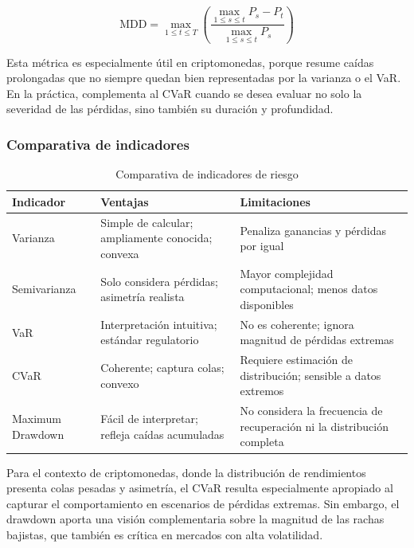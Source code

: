 \begin{equation}
  \mathrm{MDD} = \max_{1 \leq t \leq T}
  \left(
  \frac{\max_{1 \leq s \leq t} P_s - P_t}{\max_{1 \leq s \leq t} P_s}
  \right)
\end{equation}

Esta métrica es especialmente útil en criptomonedas, porque resume
caídas prolongadas que no siempre quedan bien representadas por la
varianza o el VaR. En la práctica, complementa al CVaR cuando se desea
evaluar no solo la severidad de las pérdidas, sino también su duración
y profundidad.

\subsubsection{Comparativa de indicadores}

\begin{table}[ht]
  \centering
  \caption{Comparativa de indicadores de riesgo}
  \label{tab:indicadores-riesgo}
  \begin{tabularx}{\textwidth}{lXX}
    \toprule
    \textbf{Indicador} & \textbf{Ventajas} & \textbf{Limitaciones} \\
    \midrule
    Varianza &
    Simple de calcular; ampliamente conocida; convexa &
    Penaliza ganancias y pérdidas por igual \\
    \addlinespace
    Semivarianza &
    Solo considera pérdidas; asimetría realista &
    Mayor complejidad computacional; menos datos disponibles \\
    \addlinespace
    VaR &
    Interpretación intuitiva; estándar regulatorio &
    No es coherente; ignora magnitud de pérdidas extremas \\
    \addlinespace
    CVaR &
    Coherente; captura colas; convexo &
    Requiere estimación de distribución; sensible a datos extremos \\
    \addlinespace
    Maximum Drawdown &
    Fácil de interpretar; refleja caídas acumuladas &
    No considera la frecuencia de recuperación ni la distribución completa \\
    \bottomrule
  \end{tabularx}
\end{table}

Para el contexto de criptomonedas, donde la distribución de
rendimientos presenta colas pesadas y asimetría, el CVaR resulta
especialmente apropiado al capturar el comportamiento en escenarios
de pérdidas extremas. Sin embargo, el drawdown aporta una visión
complementaria sobre la magnitud de las rachas bajistas, que también es
crítica en mercados con alta volatilidad.


